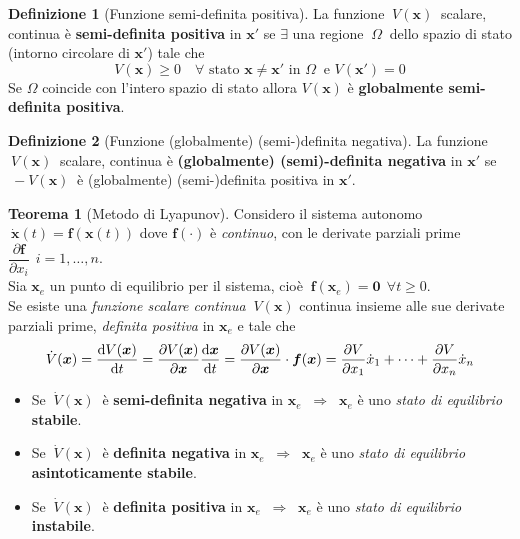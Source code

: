 \documentclass[a4paper]{article}
\renewcommand{\vec}{\bm}
\theoremstyle{definition}
\newtheorem{thm}{Teorema}[subsection]
\newtheorem{defn}{Definizione}[subsection]
\begin{document}
				\begin{defn}[Funzione semi-definita positiva]
					La funzione $\ V(\vec{x}) \ $ scalare, continua è \textbf{semi-definita positiva} in $ \vec{x}' $ se $ \exists $ una regione $\ \Omega\ $ dello spazio di stato (intorno circolare di $ \vec{x}' $) tale che
					\[
						V(\vec{x}) \geq 0 \quad \forall \text{ stato } \vec{x}\neq \vec{x}' \text{ in } \Omega\ \text{ e } V(\vec{x}') = 0 
					\]
					Se $ \Omega $ coincide con l'intero spazio di stato allora $ V(\vec{x}) $ è \textbf{globalmente semi-definita positiva}.
				\end{defn}
				
				\begin{defn}[Funzione (globalmente) (semi-)definita negativa]
						La funzione $\ V(\vec{x}) \ $ scalare, continua è \textbf{(globalmente) (semi)-definita negativa} in $ \vec{x}' $ se $\ -V(\vec{x})\ $ è (globalmente) (semi-)definita positiva in $ \vec{x}' $.
				\end{defn}
				
				\begin{thm}[Metodo di Lyapunov]
					Considero il sistema autonomo $\ \dot{\vec{x}}(t) = \vec{f}(\vec{x}(t)) $ dove $ \vec{f}(\cdot) $ è \textit{continuo}, con le derivate parziali prime $ \dfrac{\partial \vec{f}}{\partial x_i}\ \ i=1,\dots,n $.\\
					Sia $ \vec{x}_e $ un punto di equilibrio per il sistema, cioè $ \ \vec{f}(\vec{x}_e) = \vec{0}\ \ \forall t\geq 0 $.\\
					Se esiste una \textit{funzione scalare continua} $ \ V(\vec{x}) $ continua insieme alle sue derivate parziali prime, \textit{definita positiva} in $ \vec{x}_e $ e tale che
					\[
						\dot{V}(\vec{x}) = \dv{V(\vec{x})}{t} = \partialderivative{V(\vec{x})}{\vec{x}}\dv{\vec{x}}{t} =
						\partialderivative{V(\vec{x})}{\vec{x}}\cdot \vec{f}(\vec{x}) = 
						\partialderivative{V}{x_1}\dot{x}_1 + \cdots + \partialderivative{V}{x_n}\dot{x}_n
					\]
					\begin{itemize}
						\item Se $\ \dot{V}(\vec{x})\ $ è \textbf{semi-definita negativa} in $ \vec{x}_e $
						$ \ \Rightarrow\ $ $ \vec{x}_e $ è uno \textit{stato di equilibrio} \textbf{stabile}.
						\item Se $\ \dot{V}(\vec{x})\ $ è \textbf{definita negativa} in $ \vec{x}_e $
						$ \ \Rightarrow\ $ $ \vec{x}_e $ è uno \textit{stato di equilibrio} \textbf{asintoticamente stabile}.
						\item Se $\ \dot{V}(\vec{x})\ $ è \textbf{definita positiva} in $ \vec{x}_e $
						$ \ \Rightarrow\ $ $ \vec{x}_e $ è uno \textit{stato di equilibrio} \textbf{instabile}.
					\end{itemize}
					
				\end{thm}
				
\end{document}
